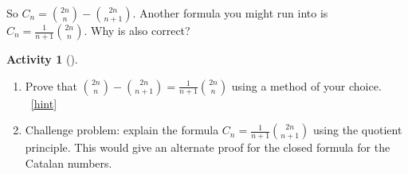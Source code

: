 \documentclass[10pt,]{book}
\theoremstyle{plain}
\theoremstyle{definition}
\theoremstyle{definition}
\theoremstyle{definition}
\newtheorem{activity}[project]{Activity}
\numberwithin{equation}{chapter}
\begin{document}
\hypertarget{p-611}{}%
So \(C_n = \binom{2n}{n} - \binom{2n}{n+1}\).  Another formula you might run into is \(C_n = \frac{1}{n+1}\binom{2n}{n}\).  Why is also correct?%
\begin{activity}[]\label{activity-121}
\leavevmode%
\begin{enumerate}[font=\bfseries,label=(\alph*),ref=\alph*]
\item\label{task-126} \hypertarget{p-612}{}%
Prove that \(\binom{2n}{n} - \binom{2n}{n+1} = \frac{1}{n+1}\binom{2n}{n}\) using a method of your choice.%
~\hfill{\tiny\hyperlink{a-121.a}{[hint]}\hypertarget{q-121.a}{}}\item\label{task-127} \hypertarget{p-614}{}%
Challenge problem: explain the formula \(C_n = \frac{1}{n+1}\binom{2n}{n+1}\) using the quotient principle.  This would give an alternate proof for the closed formula for the Catalan numbers.%
\end{enumerate}
\end{activity}
\typeout{************************************************}
\typeout{************************************************}
\end{document}
